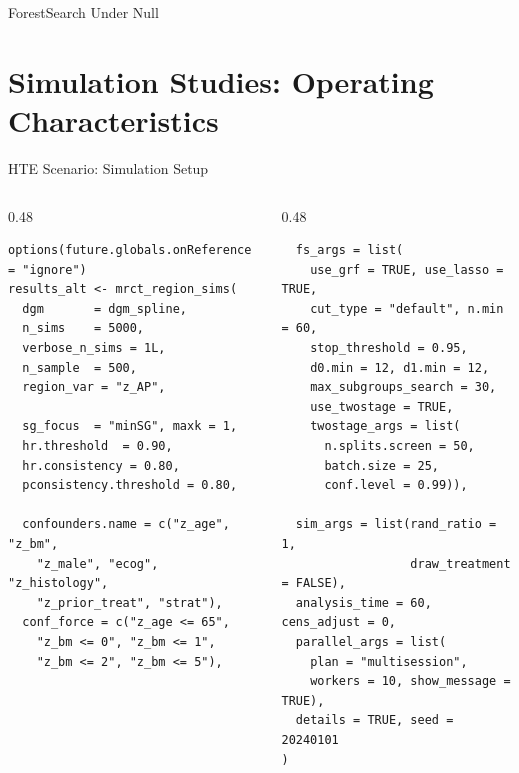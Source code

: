 \documentclass[
  ignorenonframetext,
  aspectratio=169]{beamer}
\begin{document}
\begin{frame}{ForestSearch Under Null}
\normalsize
\end{frame}

\section{Simulation Studies: Operating
Characteristics}\label{simulation-studies-operating-characteristics}

\begin{frame}[fragile]{HTE Scenario: Simulation Setup}
\label{hte-scenario-simulation-setup}
\begin{columns}[T]
\begin{column}{0.48\textwidth}
\begin{lstlisting}
options(future.globals.onReference = "ignore")
results_alt <- mrct_region_sims(
  dgm       = dgm_spline,
  n_sims    = 5000,
  verbose_n_sims = 1L,
  n_sample  = 500,
  region_var = "z_AP",

  sg_focus  = "minSG", maxk = 1,
  hr.threshold  = 0.90,
  hr.consistency = 0.80,
  pconsistency.threshold = 0.80,

  confounders.name = c("z_age", "z_bm",
    "z_male", "ecog", "z_histology",
    "z_prior_treat", "strat"),
  conf_force = c("z_age <= 65",
    "z_bm <= 0", "z_bm <= 1",
    "z_bm <= 2", "z_bm <= 5"),
\end{lstlisting}
\end{column}
\begin{column}{0.48\textwidth}
\begin{lstlisting}
  fs_args = list(
    use_grf = TRUE, use_lasso = TRUE,
    cut_type = "default", n.min = 60,
    stop_threshold = 0.95,
    d0.min = 12, d1.min = 12,
    max_subgroups_search = 30,
    use_twostage = TRUE,
    twostage_args = list(
      n.splits.screen = 50,
      batch.size = 25,
      conf.level = 0.99)),

  sim_args = list(rand_ratio = 1,
                  draw_treatment = FALSE),
  analysis_time = 60, cens_adjust = 0,
  parallel_args = list(
    plan = "multisession",
    workers = 10, show_message = TRUE),
  details = TRUE, seed = 20240101
)
\end{lstlisting}
\end{column}
\end{columns}

\normalsize
\end{frame}
\end{document}
